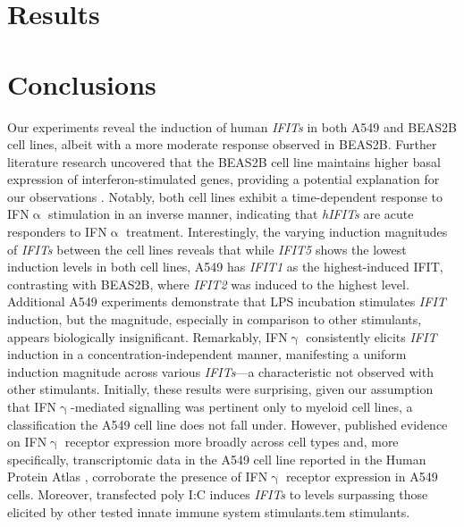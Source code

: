 \section{Results} \label{sec:Results-Chapter 1}


\section{Conclusions} \label{sec:Conclusions Chapter 1}
Our experiments reveal the induction of human \textit{IFITs} in both A549 and BEAS2B cell lines, albeit with a more moderate response observed in BEAS2B. Further literature research uncovered that the BEAS2B cell line maintains higher basal expression of interferon-stimulated genes, providing a potential explanation for our observations \cite{Seng2014HighResistance}. Notably, both cell lines exhibit a time-dependent response to IFN$\upalpha$ stimulation in an inverse manner, indicating that \textit{hIFITs} are acute responders to IFN$\upalpha$ treatment. Interestingly, the varying induction magnitudes of \textit{IFITs} between the cell lines reveals that while \textit{IFIT5} shows the lowest induction levels in both cell lines, A549 has \textit{IFIT1} as the highest-induced IFIT, contrasting with BEAS2B, where \textit{IFIT2} was induced to the highest level. Additional A549 experiments demonstrate that LPS incubation stimulates \textit{IFIT} induction, but the magnitude, especially in comparison to other stimulants, appears biologically insignificant. Remarkably, IFN$\upgamma$ consistently elicits \textit{IFIT} induction in a concentration-independent manner, manifesting a uniform induction magnitude across various \textit{IFITs}—a characteristic not observed with other stimulants. Initially, these results were surprising, given our assumption that IFN$\upgamma$-mediated signalling was pertinent only to myeloid cell lines, a classification the A549 cell line does not fall under. However, published evidence on IFN$\upgamma$ receptor expression more broadly across cell types \cite{Ivashkiv2018IFN:Immunotherapy} and, more specifically, transcriptomic data in the A549 cell line reported in the Human Protein Atlas \cite{Uhlen2015Tissue-basedProteome}, corroborate the presence of IFN$\upgamma$ receptor expression in A549 cells. Moreover, transfected poly I:C induces \textit{IFITs} to levels surpassing those elicited by other tested innate immune system stimulants.tem stimulants.

